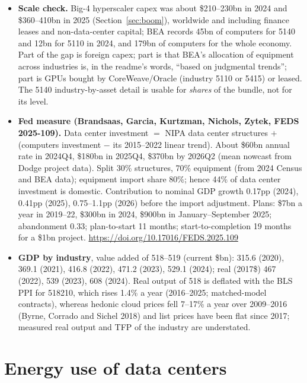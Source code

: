 \documentclass[11pt]{article}
\begin{document}
\begin{itemize}
  \item \textbf{Scale check.} Big-4 hyperscaler capex was about \$210--230bn in 2024 and \$360--410bn in 2025 (Section~\ref{sec:boom}), worldwide and including finance leases and non-data-center capital; BEA records 45bn of computers for 5140 and 12bn for 5110 in 2024, and 179bn of computers for the whole economy. Part of the gap is foreign capex; part is that BEA's allocation of equipment across industries is, in the readme's words, ``based on judgmental trends''; part is GPUs bought by CoreWeave/Oracle (industry 5110 or 5415) or leased. The 5140 industry-by-asset detail is usable for \emph{shares} of the bundle, not for its level.
  \item \textbf{Fed measure (Brandsaas, Garcia, Kurtzman, Nichols, Zytek, FEDS 2025-109).} Data center investment $=$ NIPA data center structures $+$ (computers investment $-$ its 2015--2022 linear trend). About \$60bn annual rate in 2024Q4, \$180bn in 2025Q4, \$370bn by 2026Q2 (mean nowcast from Dodge project data). Split 30\% structures, 70\% equipment (from 2024 Census and BEA data); equipment import share 80\%; hence 44\% of data center investment is domestic. Contribution to nominal GDP growth 0.17pp (2024), 0.41pp (2025), 0.75--1.1pp (2026) before the import adjustment. Plans: \$7bn a year in 2019--22, \$300bn in 2024, \$900bn in January--September 2025; abandonment 0.33; plan-to-start 11 months; start-to-completion 19 months for a \$1bn project. \url{https://doi.org/10.17016/FEDS.2025.109}
  \item \textbf{GDP by industry}, value added of 518--519 (current \$bn): 315.6 (2020), 369.1 (2021), 416.8 (2022), 471.2 (2023), 529.1 (2024); real (2017\$) 467 (2022), 539 (2023), 608 (2024). Real output of 518 is deflated with the BLS PPI for 518210, which rises 1.4\% a year (2016--2025; matched-model contracts), whereas hedonic cloud prices fell 7--17\% a year over 2009--2016 (Byrne, Corrado and Sichel 2018) and list prices have been flat since 2017; measured real output and TFP of the industry are understated.
\end{itemize}

\section{Energy use of data centers}\label{sec:energy}
\end{document}
